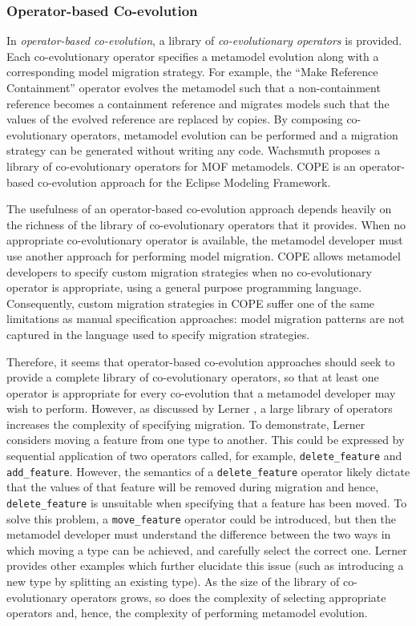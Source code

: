 \subsubsection{Operator-based Co-evolution}
\label{subsec:operator-based_co-evolution}
In \emph{operator-based co-evolution}, a library of \emph{co-evolutionary operators} is provided. Each co-evolutionary operator specifies a metamodel evolution along with a corresponding model migration strategy. For example, the ``Make Reference Containment'' operator evolves the metamodel such that a non-containment reference becomes a containment reference and migrates models such that the values of the evolved reference are replaced by copies. By composing co-evolutionary operators, metamodel evolution can be performed and a migration strategy can be generated without writing any code. Wachsmuth \cite{wachsmuth07metamodel} proposes a library of co-evolutionary operators for MOF metamodels. COPE \cite{herrmannsdoerfer09cope} is an operator-based co-evolution approach for the Eclipse Modeling Framework.

The usefulness of an operator-based co-evolution approach depends heavily on the richness of the library of co-evolutionary operators that it provides. When no appropriate co-evolutionary operator is available, the metamodel developer must use another approach for performing model migration. COPE allows metamodel developers to specify custom migration strategies when no co-evolutionary operator is appropriate, using a general purpose programming language. Consequently, custom migration strategies in COPE suffer one of the same limitations as manual specification approaches: model migration patterns are not captured in the language used to specify migration strategies. 

Therefore, it seems that operator-based co-evolution approaches should seek to provide a complete library of co-evolutionary operators, so that at least one operator is appropriate for every co-evolution that a metamodel developer may wish to perform. However, as discussed by Lerner \cite{lerner00model}, a large library of operators increases the complexity of specifying migration. To demonstrate, Lerner considers moving a feature from one type to another. This could be expressed by sequential application of two operators called, for example, \texttt{delete\_feature} and \texttt{add\_feature}. However, the semantics of a \texttt{delete\_feature} operator likely dictate that the  values of that feature will be removed during migration and hence, \texttt{delete\_feature} is unsuitable when specifying that a feature has been moved. To solve this problem, a \texttt{move\_feature} operator could be introduced, but then the metamodel developer must understand the difference between the two ways in which moving a type can be achieved, and carefully select the correct one. Lerner provides other examples which further elucidate this issue (such as introducing a new type by splitting an existing type). As the size of the library of co-evolutionary operators grows, so does the complexity of selecting appropriate operators and, hence, the complexity of performing metamodel evolution.

